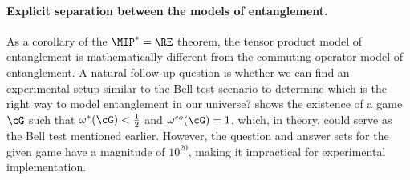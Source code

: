 


\paragraph{Explicit separation between the models of entanglement. } As a corollary of the $\MIP^*=\RE$ theorem, the tensor product model of entanglement is mathematically different from the commuting operator model of entanglement. A natural follow-up question is whether we can find an experimental setup similar to the Bell test scenario to determine which is the right way to model entanglement in our universe? \cite[Theorem 12.10]{jiMIPRE2022a} shows the existence of a game $\cG$ such that $\omega^*(\cG) < \frac{1}{2}$ and $\omega^{co}(\cG) = 1$, which, in theory, could serve as the Bell test mentioned earlier. However, the question and answer sets for the given game have a magnitude of $10^{20}$, making it impractical for experimental implementation. 

